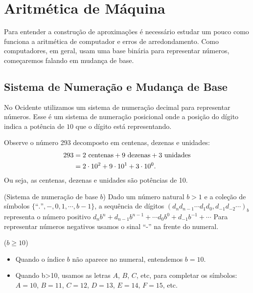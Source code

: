\chapter{Aritmética de Máquina}
Para entender a construção de aproximações é necessário estudar um pouco como funciona a aritmética de computador e erros de arredondamento. Como computadores, em geral, usam uma base binária para representar números, começaremos falando em mudança de base.

\section{Sistema de Numeração e Mudança de Base}
No Ocidente utilizamos um sistema de numeração decimal para representar números. Esse é um sistema de numeração posicional onde a posição do dígito indica a potência de $10$ que o dígito está representando.

\begin{ex}
  Observe o número 293 decomposto em centenas, dezenas e unidades:
  \begin{align*}
    293&= 2\ \hbox{centenas}+9\ \hbox{dezenas}+3\ \hbox{unidades}\\
    &= 2\cdot 10^2+9\cdot 10^1+3\cdot 10^0.
  \end{align*}
  Ou seja, as centenas, dezenas e unidades são potências de 10.
\end{ex}

\begin{defn}(Sistema de numeração de base $b$)
Dado um número natural $b>1$ e  a coleção de símbolos $\{\text{``.''}, - ,0, 1, \cdots, b-1\}$, a sequência de dígitos
$
(d_nd_{n-1}\cdots d_1d_0,d_{-1}d_{-2}\cdots)_b
$
representa o número positivo
$
d_nb^n+d_{n-1}b^{n-1}+\cdots d_0b^0+d_{-1}b^{-1}+\cdots
$
Para representar números negativos usamos o sinal ``-'' na frente do numeral.
\end{defn}

\begin{obs}($b\geq 10$)

\begin{itemize}
\item Quando o índice $b$ não aparece no numeral, entendemos $b=10$.
\item Quando b>10, usamos as letras $A$, $B$, $C$, etc, para completar os símbolos: $A=10$, $B=11$, $C=12$, $D=13$, $E=14$, $F=15$, etc.
\end{itemize}
\end{obs}


